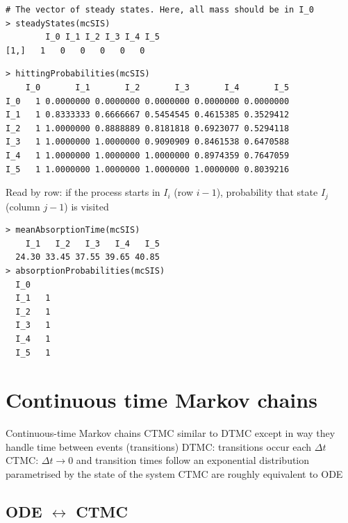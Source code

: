 \documentclass[aspectratio=43]{beamer}
\begin{document}
\begin{frame}[fragile]
\begin{lstlisting}
# The vector of steady states. Here, all mass should be in I_0
> steadyStates(mcSIS)
        I_0 I_1 I_2 I_3 I_4 I_5
[1,]   1   0   0   0   0   0    
\end{lstlisting}
\vfill
\begin{lstlisting}
> hittingProbabilities(mcSIS)
    I_0       I_1       I_2       I_3       I_4       I_5
I_0   1 0.0000000 0.0000000 0.0000000 0.0000000 0.0000000
I_1   1 0.8333333 0.6666667 0.5454545 0.4615385 0.3529412
I_2   1 1.0000000 0.8888889 0.8181818 0.6923077 0.5294118
I_3   1 1.0000000 1.0000000 0.9090909 0.8461538 0.6470588
I_4   1 1.0000000 1.0000000 1.0000000 0.8974359 0.7647059
I_5   1 1.0000000 1.0000000 1.0000000 1.0000000 0.8039216
\end{lstlisting}
Read by row: if the process starts in $I_i$ (row $i-1$), probability that state $I_j$ (column $j-1$) is visited
\end{frame}

\begin{frame}[fragile]
\begin{lstlisting}
> meanAbsorptionTime(mcSIS)
    I_1   I_2   I_3   I_4   I_5 
  24.30 33.45 37.55 39.65 40.85 
> absorptionProbabilities(mcSIS)
  I_0
  I_1   1
  I_2   1
  I_3   1
  I_4   1
  I_5   1      
\end{lstlisting}
\end{frame}

\section{Continuous time Markov chains}

\begin{frame}{Continuous-time Markov chains}
    CTMC similar to DTMC except in way they handle time between events (transitions)
\vfill
    DTMC: transitions occur each $\Delta t$
   \vfill 
    CTMC: $\Delta t\to 0$ and transition times follow an exponential distribution parametrised by the state of the system
    \vfill
    CTMC are roughly equivalent to ODE    
\end{frame}


\subsection{ODE $\leftrightarrow$ CTMC}
\end{document}
